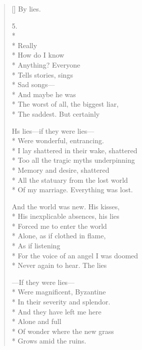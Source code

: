 \begin{verse}[\versewidth]
By lies.

5.\\*
~\\*
Really\\*
How do I know \\*
Anything? Everyone\\*
Tells stories, sings\\*
Sad songs---\\*
 And maybe he was\\*
The worst of all, the biggest liar,\\*
The saddest.  But certainly

Hs lies---if they were lies---\\*
Were wonderful, entrancing.\\*
I lay shattered in their wake, shattered\\*
Too all the tragic myths underpinning\\*
Memory and desire, shattered\\*
All the statuary from the lost world\\*
Of my marriage. Everything was lost.

And the world was new.  His kisses,\\*
His inexplicable absences, his lies\\*
Forced me to enter the world \\*
Alone, as if clothed in flame,\\*
As if listening\\*
For the voice of an angel I was doomed\\*
Never again to hear.    The lies

---If they were lies---\\*
Were magnificent, Byzantine\\*
 In their severity and splendor.\\*
And they have left me here\\*
Alone and full\\*
Of wonder where the new grass\\*
Grows amid the ruins.
\end{verse}
